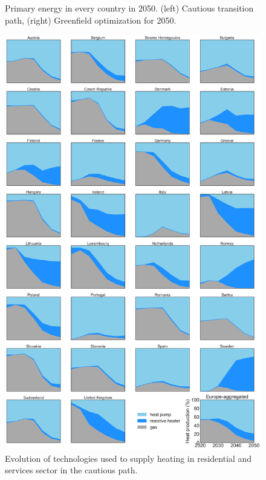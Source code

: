 \documentclass[3p]{elsarticle} %
\begin{document}
\begin{figure}[!h]
\centering
\caption{Primary energy in every country in 2050. (left) Cautious transition path, (right) Greenfield optimization for 2050.} \label{fig_spatial_plot} 
\end{figure}

\begin{figure}[!h]
\centering
\includegraphics[width=14cm]{figures/heat_production_Base_go.png}
\caption{Evolution of technologies used to supply heating in residential and services sector in the cautious path. } \label{fig_heating_shares} 
\end{figure}
\end{document}
